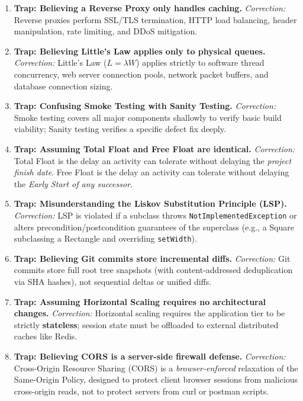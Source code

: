 \begin{enumerate}[label=\arabic*.,leftmargin=2em]
    \item \textbf{Trap: Believing a Reverse Proxy only handles caching.}
    \textit{Correction:} Reverse proxies perform SSL/TLS termination, HTTP load balancing, header manipulation, rate limiting, and DDoS mitigation.

    \item \textbf{Trap: Believing Little's Law applies only to physical queues.}
    \textit{Correction:} Little's Law ($L = \lambda W$) applies strictly to software thread concurrency, web server connection pools, network packet buffers, and database connection sizing.

    \item \textbf{Trap: Confusing Smoke Testing with Sanity Testing.}
    \textit{Correction:} Smoke testing covers all major components shallowly to verify basic build viability; Sanity testing verifies a specific defect fix deeply.

    \item \textbf{Trap: Assuming Total Float and Free Float are identical.}
    \textit{Correction:} Total Float is the delay an activity can tolerate without delaying the \textit{project finish date}. Free Float is the delay an activity can tolerate without delaying the \textit{Early Start of any successor}.

    \item \textbf{Trap: Misunderstanding the Liskov Substitution Principle (LSP).}
    \textit{Correction:} LSP is violated if a subclass throws \lstinline|NotImplementedException| or alters precondition/postcondition guarantees of the superclass (e.g., a Square subclassing a Rectangle and overriding \lstinline|setWidth|).

    \item \textbf{Trap: Believing Git commits store incremental diffs.}
    \textit{Correction:} Git commits store full root tree snapshots (with content-addressed deduplication via SHA hashes), not sequential deltas or unified diffs.

    \item \textbf{Trap: Assuming Horizontal Scaling requires no architectural changes.}
    \textit{Correction:} Horizontal scaling requires the application tier to be strictly \textbf{stateless}; session state must be offloaded to external distributed caches like Redis.

    \item \textbf{Trap: Believing CORS is a server-side firewall defense.}
    \textit{Correction:} Cross-Origin Resource Sharing (CORS) is a \textit{browser-enforced} relaxation of the Same-Origin Policy, designed to protect client browser sessions from malicious cross-origin reads, not to protect servers from curl or postman scripts.


\end{enumerate}
